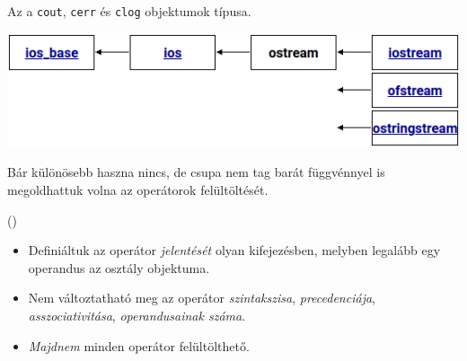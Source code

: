 \documentclass[usenames,dvipsnames,aspectratio=169]{beamer}
\begin{document}
\begin{frame}
    \begin{exampleblock}{}
        \footnotesize
        
    \end{exampleblock}
\end{frame}

\begin{frame}
    \begin{exampleblock}{}
        \small
        
    \end{exampleblock}
\end{frame}

\begin{frame}
    Az  a \texttt{cout}, \texttt{cerr} és \texttt{clog} objektumok típusa.
    \vfill
    \begin{center}
        \includegraphics[scale=.5]{ostream.png}
    \end{center}
    \vfill
    Bár különösebb haszna nincs, de csupa nem tag barát függvénnyel is megoldhattuk volna az operátorok felültöltését.
\end{frame}

\begin{frame}
    \begin{exampleblock}{ ()}
        \scriptsize
        
        
    \end{exampleblock}
\end{frame}

\begin{frame}
    \begin{itemize}
        \item Definiáltuk az operátor \emph{jelentését} olyan kifejezésben, melyben legalább egy operandus az osztály objektuma.
        \item Nem változtatható meg az operátor \emph{szintakszisa}, \emph{precedenciája}, \emph{asszociativitása}, \emph{operandusainak száma}.
        \item \emph{Majdnem} minden operátor felültölthető.
    \end{itemize}
\end{frame}
\end{document}
